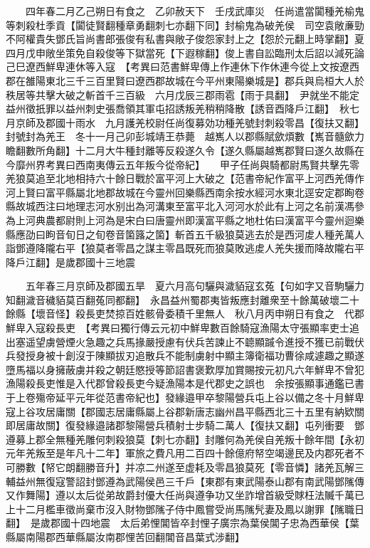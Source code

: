 　　四年春二月乙己朔日有食之　乙卯赦天下　壬戌武庫災　任尚遣當闐種羌榆鬼等刺殺杜季貢【闐徒賢翻種章勇翻刺七亦翻下同】封榆鬼為破羌侯　司空袁敞亷勁不阿權貴失鄧氏旨尚書郎張俊有私書與敞子俊怨家封上之【怨於元翻上時掌翻】夏四月戊申敞坐策免自殺俊等下獄當死【下遐稼翻】俊上書自訟臨刑太后詔以減死論　己巳遼西鮮卑連休等入寇　【考異曰范書鮮卑傳上作連休下作休連今從上文按遼西郡在雒陽東北三千三百里賢曰遼西郡故城在今平州東陽樂城是】郡兵與烏桓大人於秩居等共擊大破之斬首千三百級　六月戊辰三郡雨雹【雨于具翻】　尹就坐不能定益州徵扺罪以益州刺史張喬領其軍屯招誘叛羌稍稍降散【誘音酉降戶江翻】　秋七月京師及郡國十雨水　九月護羌校尉任尚復募効功種羌號封刺殺零昌【復扶又翻】封號封為羌王　冬十一月己卯彭城靖王恭薨　越嶲人以郡縣賦歛煩數【嶲音髓歛力瞻翻數所角翻】十二月大牛種封離等反殺遂久令【遂久縣屬越嶲郡賢曰遂久故縣在今靡州界考異曰西南夷傳云五年叛今從帝紀】　　甲子任尚與騎都尉馬賢共擊先零羌狼莫追至北地相持六十餘日戰於富平河上大破之【范書帝紀作富平上河西羌傳作河上賢曰富平縣屬北地郡故城在今靈州回樂縣西南余按水經河水東北逕安定郡眴卷縣故城西注曰地理志河水别出為河溝東至富平北入河河水於此有上河之名前漢馮參為上河典農都尉則上河為是宋白曰唐靈州即漢富平縣之地杜佑曰漢富平今靈州迴樂縣應劭曰眗音旬日之旬卷音箘簬之箘】斬首五千級狼莫逃去於是西河䖍人種羌萬人詣鄧遵降隴右平【狼莫者零昌之謀主零昌既死而狼莫敗逃䖍人羌失援而降故隴右平降戶江翻】是歲郡國十三地震

　　五年春三月京師及郡國五旱　夏六月高句驪與濊貊寇玄菟【句如字又音駒驪力知翻濊音穢貊莫百翻菟同都翻】　永昌益州蜀郡夷皆叛應封離衆至十餘萬破壞二十餘縣【壞音怪】殺長吏焚掠百姓骸骨委積千里無人　秋八月丙申朔日有食之　代郡鮮卑入寇殺長吏　【考異曰獨行傳云元初中鮮卑數百餘騎寇漁陽太守張顯率吏士追出塞遥望虜營煙火急趣之兵馬掾嚴授慮有伏兵苦諫止不聼顯䠞令進授不獲已前戰伏兵發授身被十創沒于陳顯拔刃追散兵不能制虜射中顯主簿衛福功曹徐咸遽趣之顯遂墮馬福以身擁蔽虜并殺之朝廷愍授等節詔書褒歎厚加賞賜按元初凡六年鮮卑不曾犯漁陽殺長吏惟是入代郡曾殺長吏今疑漁陽本是代郡史之誤也　余按張顯事通鑑已書于上卷殤帝延平元年從范書帝紀也】發緣邉甲卒黎陽營兵屯上谷以備之冬十月鮮卑寇上谷攻居庸關【郡國志居庸縣屬上谷郡新唐志幽州昌平縣西北三十五里有納欵關即居庸故關】復發緣邉諸郡黎陽營兵積射士步騎二萬人【復扶又翻】屯列衝要　鄧遵募上郡全無種羌雕何刺殺狼莫【刺七亦翻】封雕何為羌侯自羌叛十餘年間【永初元年羌叛至是年凡十二年】軍旅之費凡用二百四十餘億府帑空竭邊民及内郡死者不可勝數【帑它朗翻勝音升】并凉二州遂至虚耗及零昌狼莫死【零音憐】諸羌瓦解三輔益州無復寇警詔封鄧遵為武陽侯邑三千戶【東郡有東武陽泰山郡有南武陽鄧隲傳又作舞陽】遵以太后從弟故爵封優大任尚與遵争功又坐詐增首級受賕枉法贓千萬已上十二月檻車徵尚棄市沒入財物鄧隲子侍中鳳嘗受尚馬隲髠妻及鳳以謝罪【隲職日翻】　是歲郡國十四地震　太后弟悝閶皆卒封悝子廣宗為葉侯閶子忠為西華侯【葉縣屬南陽郡西華縣屬汝南郡悝苦回翻閶音昌葉式涉翻】

